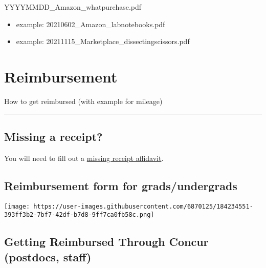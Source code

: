 \documentclass[
  letterpaper,
  DIV=11,
  numbers=noendperiod]{scrreprt}
\begin{document}
YYYYMMDD\_Amazon\_whatpurchase.pdf

\begin{itemize}
\item
  example: 20210602\_Amazon\_labnotebooks.pdf
\item
  example: 20211115\_Marketplace\_dissectingscissors.pdf
\end{itemize}

\hypertarget{reimbursement}{%
\chapter{Reimbursement}\label{reimbursement}}

How to get reimbursed (with example for mileage)

\begin{center}\rule{0.5\linewidth}{0.5pt}\end{center}

\hypertarget{missing-a-receipt}{%
\section*{\texorpdfstring{\textbf{Missing a
receipt?}}{Missing a receipt?}}\label{missing-a-receipt}}

You will need to fill out a
\href{https://drive.google.com/open?id=15O6iVj2p2Qf_em6hiHeyg3co1UQEIbzU\&authuser=k.lotterhos\%40gmail.com\&usp=drive_fs}{missing
receipt affidavit}.

\hypertarget{reimbursement-form-for-gradsundergrads}{%
\section*{\texorpdfstring{\textbf{Reimbursement form for
grads/undergrads}}{Reimbursement form for grads/undergrads}}\label{reimbursement-form-for-gradsundergrads}}

\texttt{[image: https://user-images.githubusercontent.com/6870125/184234551-393ff3b2-7bf7-42df-b7d8-9ff7ca0fb58c.png]}

\hypertarget{getting-reimbursed-through-concur-postdocs-staff}{%
\section*{\texorpdfstring{\textbf{Getting Reimbursed Through Concur
(postdocs,
staff)}}{Getting Reimbursed Through Concur (postdocs, staff)}}\label{getting-reimbursed-through-concur-postdocs-staff}}
\end{document}
